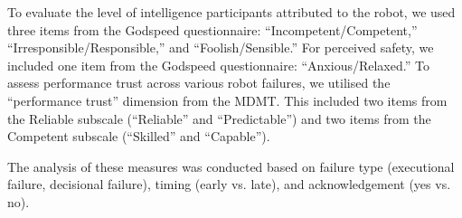To evaluate the level of intelligence participants attributed to the robot, we used three items from the Godspeed questionnaire: “Incompetent/Competent,” “Irresponsible/Responsible,” and “Foolish/Sensible.” For perceived safety, we included one item from the Godspeed questionnaire: “Anxious/Relaxed.” To assess performance trust across various robot failures, we utilised the “performance trust” dimension from the MDMT. This included two items from the Reliable subscale (“Reliable” and “Predictable”) and two items from the Competent subscale (“Skilled” and “Capable”).

The analysis of these measures was conducted based on failure type (executional failure, decisional failure), timing (early vs. late), and acknowledgement (yes vs. no).

\begin{comment}
    
\subsubsection{Perceived Intelligence}

To measure the level of intelligence that participants attribute to our robots, we extracted three items from the Godspeed questionnaire. These items are presented as semantic differential 5-point scales: “Incompetent/Competent,” “Irresponsible/Responsible,” “Foolish/Sensible.”

\subsubsection{Perceived Safety}

To measure the level of safety that participants feel towards our robots, we extracted one item from the Godspeed questionnaire. These item is presented as semantic differential 5-point scales: “Anxious/Relaxed,”

\subsubsection{Trust}

The literature has previously identified trust as a critical factor that can be adversely impacted by robot failures. To assess and compare levels of trust across various robot failures, we utilized the "performance trust" dimension from the MDMT. Additionally, we incorporated two items from the Reliable subscale (“Reliable” and “Predictable”) and two items from the Competent subscale (“Skilled” and “Capable”). All questions were rated using a 7-point Likert scale.


\end{comment}